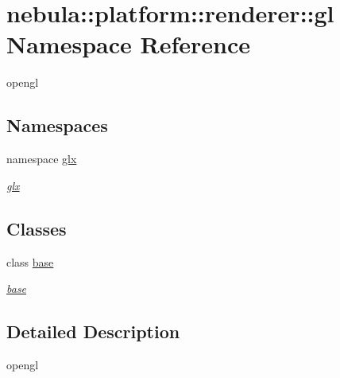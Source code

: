 \hypertarget{namespacenebula_1_1platform_1_1renderer_1_1gl}{
\section{nebula::platform::renderer::gl Namespace Reference}
\label{namespacenebula_1_1platform_1_1renderer_1_1gl}
}


opengl  
\subsection*{Namespaces}
\begin{DoxyCompactItemize}
\item 
namespace \hyperlink{namespacenebula_1_1platform_1_1renderer_1_1gl_1_1glx}{glx}


\begin{DoxyCompactList}\small\item\em \hyperlink{namespacenebula_1_1platform_1_1renderer_1_1gl_1_1glx}{glx} \item\end{DoxyCompactList}\end{DoxyCompactItemize}
\subsection*{Classes}
\begin{DoxyCompactItemize}
\item 
class \hyperlink{classnebula_1_1platform_1_1renderer_1_1gl_1_1base}{base}
\begin{DoxyCompactList}\small\item\em \hyperlink{classnebula_1_1platform_1_1renderer_1_1gl_1_1base}{base} \item\end{DoxyCompactList}\end{DoxyCompactItemize}


\subsection{Detailed Description}
opengl 